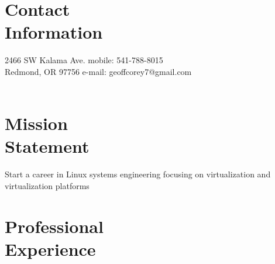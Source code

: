 \documentclass[margin,line]{resume}
\begin{document}
\begin{resume}

    \section{\mysidestyle Contact\\Information}

    2466 SW Kalama Ave.   \hfill mobile: 541-788-8015         \vspace{0mm}\\\vspace{0mm}%
    Redmond, OR 97756         \hfill e-mail: geoffcorey7@gmail.com  \vspace{0mm}\\\vspace{-4.5mm}\\

    \section{\mysidestyle Mission\\Statement}

    Start a career in Linux systems engineering focusing on virtualization
    and virtualization platforms\\

    \section{\mysidestyle Professional\\Experience}


\end{resume}
\end{document}
